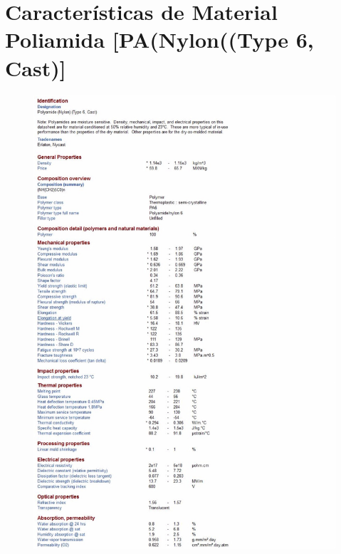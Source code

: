 \chapter{Caracter\'isticas de Material Poliamida [PA(Nylon((Type 6, Cast)]}

\newpage

\begin{figure}[H]
\centering
	\includegraphics[width=\textwidth, height=\textheight]{images/Anexos/PA1}
\end{figure}

\newpage

